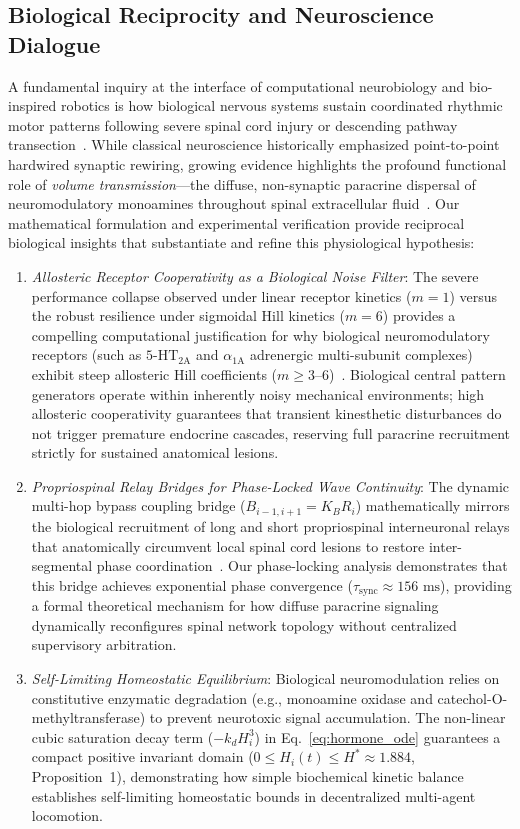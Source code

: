 \documentclass{iopjournal}
\begin{document}
\subsection{Biological Reciprocity and Neuroscience Dialogue}
A fundamental inquiry at the interface of computational neurobiology and bio-inspired robotics is how biological nervous systems sustain coordinated rhythmic motor patterns following severe spinal cord injury or descending pathway transection~\cite{courtine2008,bargmann2012,courtine2009}. While classical neuroscience historically emphasized point-to-point hardwired synaptic rewiring, growing evidence highlights the profound functional role of \textit{volume transmission}—the diffuse, non-synaptic paracrine dispersal of neuromodulatory monoamines throughout spinal extracellular fluid~\cite{bargmann2012,sillar2014,marder2006}. Our mathematical formulation and experimental verification provide reciprocal biological insights that substantiate and refine this physiological hypothesis:
\begin{enumerate}
  \item \textit{Allosteric Receptor Cooperativity as a Biological Noise Filter}: The severe performance collapse observed under linear receptor kinetics ($m=1$) versus the robust resilience under sigmoidal Hill kinetics ($m=6$) provides a compelling computational justification for why biological neuromodulatory receptors (such as $5\text{-HT}_{2\text{A}}$ and $\alpha_{1\text{A}}$ adrenergic multi-subunit complexes) exhibit steep allosteric Hill coefficients ($m \ge 3\text{--}6$)~\cite{marder2006}. Biological central pattern generators operate within inherently noisy mechanical environments; high allosteric cooperativity guarantees that transient kinesthetic disturbances do not trigger premature endocrine cascades, reserving full paracrine recruitment strictly for sustained anatomical lesions.
  \item \textit{Propriospinal Relay Bridges for Phase-Locked Wave Continuity}: The dynamic multi-hop bypass coupling bridge ($B_{i-1, i+1} = K_B R_i$) mathematically mirrors the biological recruitment of long and short propriospinal interneuronal relays that anatomically circumvent local spinal cord lesions to restore inter-segmental phase coordination~\cite{courtine2008}. Our phase-locking analysis demonstrates that this bridge achieves exponential phase convergence ($\tau_{\text{sync}} \approx 156\text{ ms}$), providing a formal theoretical mechanism for how diffuse paracrine signaling dynamically reconfigures spinal network topology without centralized supervisory arbitration.
  \item \textit{Self-Limiting Homeostatic Equilibrium}: Biological neuromodulation relies on constitutive enzymatic degradation (e.g., monoamine oxidase and catechol-O-methyltransferase) to prevent neurotoxic signal accumulation. The non-linear cubic saturation decay term ($-k_d H_i^3$) in Eq.~\ref{eq:hormone_ode} guarantees a compact positive invariant domain ($0 \le H_i(t) \le H^* \approx 1.884$, Proposition~1), demonstrating how simple biochemical kinetic balance establishes self-limiting homeostatic bounds in decentralized multi-agent locomotion.
\end{enumerate}
\end{document}
